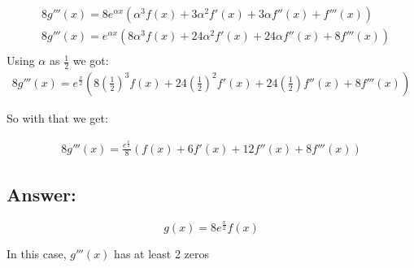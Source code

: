 \documentclass{article}
\begin{document}
    \begin{equation}
        \begin{split}
            &8g'''(x) = 8e^{\alpha x} (\alpha ^3 f(x) + 3\alpha ^2 f'(x) + 3\alpha f''(x) + f'''(x))\\
            &8g'''(x) = e^{\alpha x} (8\alpha ^3 f(x) + 24\alpha ^2 f'(x) + 24\alpha f''(x) + 8f'''(x))\\
        \end{split}
    \end{equation}
    Using $\alpha$ as $\frac{1}{2}$ we got:
    \begin{equation}
        \begin{split}
            8g'''(x) = 
            e^{\frac{x}{2}} 
            \left(8\left(\frac{1}{2}\right)^3 f(x) + 
            24\left(\frac{1}{2}\right)^2 f'(x) + 
            24\left(\frac{1}{2}\right) f''(x) + 
            8f'''(x)\right)
        \end{split}
    \end{equation}

    So with that we get:

    \begin{equation}
        \begin{split}
            8g'''(x) = 
            \frac{e^{\frac{x}{2}}}{8} 
            \left(f(x) + 
            6 f'(x) + 
            12 f''(x) + 
            8f'''(x)\right)
        \end{split}
    \end{equation}

    \subsection{Answer:}
    $$g(x) = 8e^{\frac{x}{2}} f(x)$$

    In this case, $g'''(x)$ has at least 2 zeros
\end{document}
